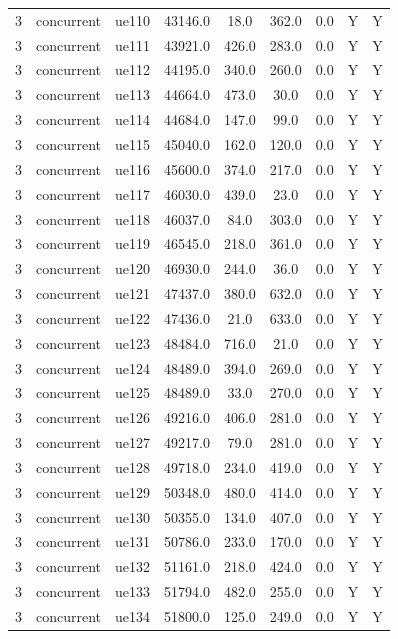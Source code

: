 \begin{table}[ht]
\begin{tabular}{|c|c|c|c|c|c|c|c|c|}
3 & concurrent & ue110 & 43146.0 & 18.0 & 362.0 & 0.0 & Y & Y \\
3 & concurrent & ue111 & 43921.0 & 426.0 & 283.0 & 0.0 & Y & Y \\
3 & concurrent & ue112 & 44195.0 & 340.0 & 260.0 & 0.0 & Y & Y \\
3 & concurrent & ue113 & 44664.0 & 473.0 & 30.0 & 0.0 & Y & Y \\
3 & concurrent & ue114 & 44684.0 & 147.0 & 99.0 & 0.0 & Y & Y \\
3 & concurrent & ue115 & 45040.0 & 162.0 & 120.0 & 0.0 & Y & Y \\
3 & concurrent & ue116 & 45600.0 & 374.0 & 217.0 & 0.0 & Y & Y \\
3 & concurrent & ue117 & 46030.0 & 439.0 & 23.0 & 0.0 & Y & Y \\
3 & concurrent & ue118 & 46037.0 & 84.0 & 303.0 & 0.0 & Y & Y \\
3 & concurrent & ue119 & 46545.0 & 218.0 & 361.0 & 0.0 & Y & Y \\
3 & concurrent & ue120 & 46930.0 & 244.0 & 36.0 & 0.0 & Y & Y \\
3 & concurrent & ue121 & 47437.0 & 380.0 & 632.0 & 0.0 & Y & Y \\
3 & concurrent & ue122 & 47436.0 & 21.0 & 633.0 & 0.0 & Y & Y \\
3 & concurrent & ue123 & 48484.0 & 716.0 & 21.0 & 0.0 & Y & Y \\
3 & concurrent & ue124 & 48489.0 & 394.0 & 269.0 & 0.0 & Y & Y \\
3 & concurrent & ue125 & 48489.0 & 33.0 & 270.0 & 0.0 & Y & Y \\
3 & concurrent & ue126 & 49216.0 & 406.0 & 281.0 & 0.0 & Y & Y \\
3 & concurrent & ue127 & 49217.0 & 79.0 & 281.0 & 0.0 & Y & Y \\
3 & concurrent & ue128 & 49718.0 & 234.0 & 419.0 & 0.0 & Y & Y \\
3 & concurrent & ue129 & 50348.0 & 480.0 & 414.0 & 0.0 & Y & Y \\
3 & concurrent & ue130 & 50355.0 & 134.0 & 407.0 & 0.0 & Y & Y \\
3 & concurrent & ue131 & 50786.0 & 233.0 & 170.0 & 0.0 & Y & Y \\
3 & concurrent & ue132 & 51161.0 & 218.0 & 424.0 & 0.0 & Y & Y \\
3 & concurrent & ue133 & 51794.0 & 482.0 & 255.0 & 0.0 & Y & Y \\
3 & concurrent & ue134 & 51800.0 & 125.0 & 249.0 & 0.0 & Y & Y \\

\end{tabular}
\end{table}
